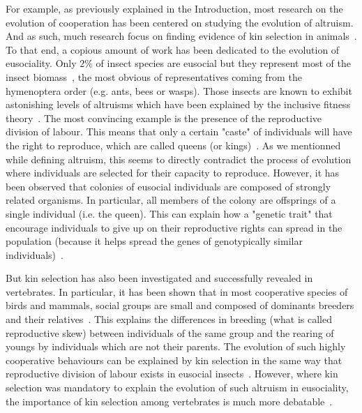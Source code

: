     For example, as previously explained in the Introduction, most research on the evolution of cooperation has been centered on studying the evolution of altruism. And as such, much research focus on finding evidence of kin selection in animals~\cite{Bourke2014}. To that end, a copious amount of work has been dedicated to the evolution of eusociality. Only $2\%$ of insect species are eusocial but they represent most of the insect biomass~\cite{Wilson2008}, the most obvious of representatives coming from the hymenoptera order (e.g. ants, bees or wasps). Those insects are known to exhibit astonishing levels of altruisms which have been explained by the inclusive fitness theory~\cite{Bourke2011, Wilson2008}. The most convincing example is the presence of the reproductive division of labour. This means that only a certain "caste" of individuals will have the right to reproduce, which are called queens (or kings)~\cite{Wilson1990}. As we mentionned while defining altruism, this seems to directly contradict the process of evolution where individuals are selected for their capacity to reproduce. However, it has been observed that colonies of eusocial individuals are composed of strongly related organisms. In particular, all members of the colony are offsprings of a single individual (i.e. the queen). This can explain how a "genetic trait" that encourage individuals to give up on their reproductive rights can spread in the population (because it helps spread the genes of genotypically similar individuals)~\cite{Queller1998}.


    But kin selection has also been investigated and successfully revealed in vertebrates. In particular, it has been shown that in most cooperative species of birds and mammals, social groups are small and composed of dominants breeders and their relatives~\cite{Dugatkin1997, Clutton-Brock2002}. This explains the differences in breeding (what is called reproductive skew) between individuals of the same group and the rearing of youngs by individuals which are not their parents. The evolution of such highly cooperative behaviours can be explained by kin selection in the same way that reproductive division of labour exists in eusocial insects~\cite{Bourke2011}. However, where kin selection was mandatory to explain the evolution of such altruism in eusociality, the importance of kin selection among vertebrates is much more debatable~\cite{Griffin2003, Clutton-Brock2002}.

